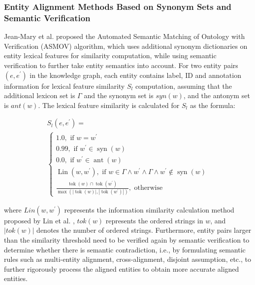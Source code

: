 \documentclass[sigconf]{acmart}
\begin{document}
{\subsubsection{Entity Alignment Methods Based on Synonym Sets and Semantic Verification}

Jean-Mary et al. \cite{jean2009ontology} proposed the Automated Semantic Matching of Ontology with Verification (ASMOV) algorithm, which uses additional synonym dictionaries on entity lexical features for similarity computation, while using semantic verification to further take entity semantics into account. For two entity pairs $(e,e^{\prime})$ in the knowledge graph, each entity contains label, ID and annotation information for lexical feature similarity $S_l$ computation, assuming that the additional lexicon set is $\Gamma$ and the synonym set is $syn(w)$, and the antonym set is $ant(w)$. The lexical feature similarity is calculated for $S_l$ as the formula:

\begin{equation}
    \begin{array}{l}
    S_{l}\left(e, e^{\prime}\right)= \\
    \left\{\begin{array}{l}
    1.0, \text { if } w=w^{\prime} \\
    0.99, \text { if } w^{\prime} \in \operatorname{syn}(w) \\
    0.0, \text { if } w^{\prime} \in \operatorname{ant}(w) \\
    \operatorname{Lin}\left(w, w^{\prime}\right), \text { if } w \in \Gamma \wedge w^{\prime} \wedge \Gamma \wedge w^{\prime} \notin \operatorname{syn}(w) \\
    \frac{\operatorname{tok}(w) \cap \operatorname{tok}\left(w^{\prime}\right)}{\max \left(|\operatorname{tok}(w)|,\left|\operatorname{tok}\left(w^{\prime}\right)\right|\right)}, \text { otherwise }
    \end{array}\right.
    \end{array}
\end{equation}

where $Lin(w,w^{\prime})$ represents the information similarity calculation method proposed by Lin et al. \cite{lin1998information}, $tok(w)$ represents the ordered strings in $w$, and $|tok(w)|$ denotes the number of ordered strings.
Furthermore, entity pairs larger than the similarity threshold need to be verified again by semantic verification to determine whether there is semantic contradiction, i.e., by formulating semantic rules such as multi-entity alignment, cross-alignment, disjoint assumption, etc., to further rigorously process the aligned entities to obtain more accurate aligned entities.

}
\end{document}
